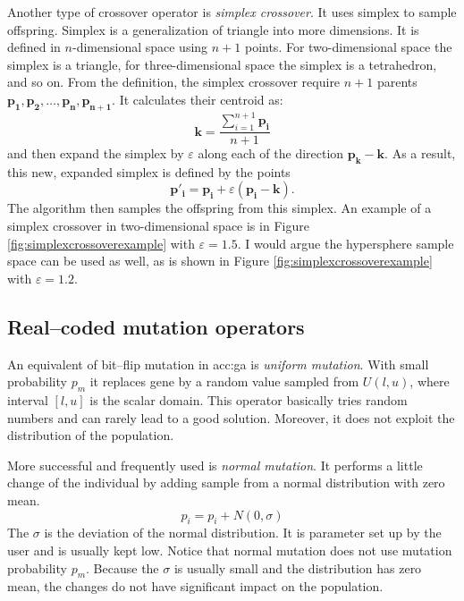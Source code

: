 Another type of crossover operator is \emph{simplex crossover}. It uses simplex to sample offspring. Simplex is a generalization of triangle into more dimensions. It is defined in $n$-dimensional space using $n+1$ points. For two-dimensional space the simplex is a triangle, for three-dimensional space the simplex is a tetrahedron, and so on. From the definition, the simplex crossover require $n+1$ parents $\mathbf{p_1}, \mathbf{p_2}, \dots, \mathbf{p_n}, \mathbf{p_{n+1}}$. It calculates their centroid as:
$$
\mathbf{k}=\frac{\sum_{i=1}^{n+1} \mathbf{p_i}}{n+1}
$$
and then expand the simplex by $\varepsilon$ along each of the direction $\mathbf{p_k} - \mathbf{k}$. As a result, this new, expanded simplex is defined by the points
$$
\mathbf{p'_i} = \mathbf{p_i} + \varepsilon\left( \mathbf{p_i} - \mathbf{k} \right).
$$
The algorithm then samples the offspring from this simplex. An example of a simplex crossover in two-dimensional space is in Figure \ref{fig:simplexcrossoverexample} with $\varepsilon=1.5$.
I would argue the hypersphere sample space can be used as well, as is shown in Figure \ref{fig:simplexcrossoverexample} with $\varepsilon=1.2$.

\subsection{Real--coded mutation operators}

An equivalent of bit--flip mutation in \acrshort{acc:ga} is \emph{uniform mutation}. With small probability $p_m$ it replaces gene by a random value sampled from $U(l,u)$, where interval $\left[l,u\right]$ is the scalar domain. This operator basically tries random numbers and can rarely lead to a good solution. Moreover, it does not exploit the distribution of the population.

More successful and frequently used is \emph{normal mutation}. It performs a little change of the individual by adding sample from a normal distribution with zero mean.
$$
p_i = p_i + N(0,\sigma)
$$
The $\sigma$ is the deviation of the normal distribution. It is parameter set up by the user and is usually kept low. Notice that normal mutation does not use mutation probability $p_m$. Because the $\sigma$ is usually small and the distribution has zero mean, the changes do not have significant impact on the population.

